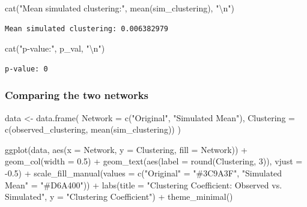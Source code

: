\documentclass[
  letterpaper,
  DIV=11,
  numbers=noendperiod]{scrartcl}
\newenvironment{Shaded}{\begin{snugshade}}{\end{snugshade}}
\newcommand{\AttributeTok}[1]{\textcolor[rgb]{0.40,0.45,0.13}{#1}}
\newcommand{\DecValTok}[1]{\textcolor[rgb]{0.68,0.00,0.00}{#1}}
\newcommand{\FloatTok}[1]{\textcolor[rgb]{0.68,0.00,0.00}{#1}}
\newcommand{\FunctionTok}[1]{\textcolor[rgb]{0.28,0.35,0.67}{#1}}
\newcommand{\NormalTok}[1]{\textcolor[rgb]{0.00,0.23,0.31}{#1}}
\newcommand{\OtherTok}[1]{\textcolor[rgb]{0.00,0.23,0.31}{#1}}
\newcommand{\SpecialCharTok}[1]{\textcolor[rgb]{0.37,0.37,0.37}{#1}}
\newcommand{\StringTok}[1]{\textcolor[rgb]{0.13,0.47,0.30}{#1}}
\begin{document}
\begin{Shaded}
\begin{Highlighting}[]
\FunctionTok{cat}\NormalTok{(}\StringTok{"Mean simulated clustering:"}\NormalTok{, }\FunctionTok{mean}\NormalTok{(sim\_clustering), }\StringTok{"}\SpecialCharTok{\textbackslash{}n}\StringTok{"}\NormalTok{)}
\end{Highlighting}
\end{Shaded}

\begin{verbatim}
Mean simulated clustering: 0.006382979 
\end{verbatim}

\begin{Shaded}
\begin{Highlighting}[]
\FunctionTok{cat}\NormalTok{(}\StringTok{"p{-}value:"}\NormalTok{, p\_val, }\StringTok{"}\SpecialCharTok{\textbackslash{}n}\StringTok{"}\NormalTok{)}
\end{Highlighting}
\end{Shaded}

\begin{verbatim}
p-value: 0 
\end{verbatim}

\subsubsection{Comparing the two
networks}\label{comparing-the-two-networks}

\begin{Shaded}
\begin{Highlighting}[]
\NormalTok{data }\OtherTok{\textless{}{-}} \FunctionTok{data.frame}\NormalTok{(}
  \AttributeTok{Network =} \FunctionTok{c}\NormalTok{(}\StringTok{"Original"}\NormalTok{, }\StringTok{"Simulated Mean"}\NormalTok{),}
  \AttributeTok{Clustering =} \FunctionTok{c}\NormalTok{(observed\_clustering, }\FunctionTok{mean}\NormalTok{(sim\_clustering))}
\NormalTok{)}

\FunctionTok{ggplot}\NormalTok{(data, }\FunctionTok{aes}\NormalTok{(}\AttributeTok{x =}\NormalTok{ Network, }\AttributeTok{y =}\NormalTok{ Clustering, }\AttributeTok{fill =}\NormalTok{ Network)) }\SpecialCharTok{+}
  \FunctionTok{geom\_col}\NormalTok{(}\AttributeTok{width =} \FloatTok{0.5}\NormalTok{) }\SpecialCharTok{+}
  \FunctionTok{geom\_text}\NormalTok{(}\FunctionTok{aes}\NormalTok{(}\AttributeTok{label =} \FunctionTok{round}\NormalTok{(Clustering, }\DecValTok{3}\NormalTok{)), }\AttributeTok{vjust =} \SpecialCharTok{{-}}\FloatTok{0.5}\NormalTok{) }\SpecialCharTok{+}
  \FunctionTok{scale\_fill\_manual}\NormalTok{(}\AttributeTok{values =} \FunctionTok{c}\NormalTok{(}\StringTok{"Original"} \OtherTok{=} \StringTok{"\#3C9A3F"}\NormalTok{,}
                               \StringTok{"Simulated Mean"} \OtherTok{=} \StringTok{"\#D6A400"}\NormalTok{)) }\SpecialCharTok{+}
  \FunctionTok{labs}\NormalTok{(}\AttributeTok{title =} \StringTok{"Clustering Coefficient: Observed vs. Simulated"}\NormalTok{,}
       \AttributeTok{y =} \StringTok{"Clustering Coefficient"}\NormalTok{) }\SpecialCharTok{+}
  \FunctionTok{theme\_minimal}\NormalTok{()}
\end{Highlighting}
\end{Shaded}
\end{document}
